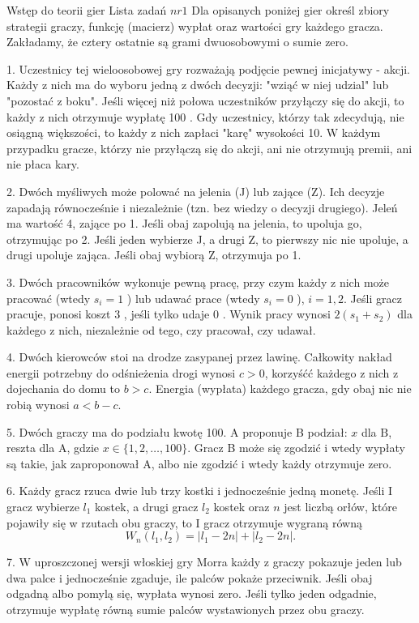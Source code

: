 \documentclass{article}
\begin{document}
Wstęp do teorii gier
Lista zadań $n r 1$
Dla opisanych poniżej gier określ zbiory strategii graczy, funkcję (macierz) wypłat oraz wartości gry każdego gracza. Zakładamy, że cztery ostatnie są grami dwuosobowymi o sumie zero.

1. Uczestnicy tej wieloosobowej gry rozważają podjęcie pewnej inicjatywy - akcji. Każdy z nich ma do wyboru jedną z dwóch decyzji: "wziąć w niej udzial" lub "pozostać z boku". Jeśli więcej niż połowa uczestników przyłączy się do akcji, to każdy z nich otrzymuje wypłatę 100 . Gdy uczestnicy, którzy tak zdecydują, nie osiągną większości, to każdy z nich zapłaci "karę" wysokości 10. W każdym przypadku gracze, którzy nie przyłączą się do akcji, ani nie otrzymują premii, ani nie płaca kary.

2. Dwóch myśliwych może polować na jelenia (J) lub zające (Z). Ich decyzje zapadają równocześnie i niezależnie (tzn. bez wiedzy o decyzji drugiego). Jeleń ma wartość 4, zające po 1. Jeśli obaj zapolują na jelenia, to upoluja go, otrzymując po 2. Jeśli jeden wybierze J, a drugi Z, to pierwszy nic nie upoluje, a drugi upoluje zająca. Jeśli obaj wybiorą Z, otrzymuja po 1.

3. Dwóch pracowników wykonuje pewną pracę, przy czym każdy z nich może pracować (wtedy $s_i=1$ ) lub udawać prace (wtedy $s_i=0$ ), $i=1,2$. Jeśli gracz pracuje, ponosi koszt 3 , jeśli tylko udaje 0 . Wynik pracy wynosi $2\left(s_1+s_2\right)$ dla każdego z nich, niezależnie od tego, czy pracował, czy udawał.

4. Dwóch kierowców stoi na drodze zasypanej przez lawinę. Całkowity nakład energii potrzebny do odśnieżenia drogi wynosi $c>0$, korzyśćć każdego z nich z dojechania do domu to $b>c$. Energia (wypłata) każdego gracza, gdy obaj nic nie robią wynosi $a<b-c$.

5. Dwóch graczy ma do podziału kwotę 100. A proponuje B podział: $x$ dla $\mathrm{B}$, reszta dla $\mathrm{A}$, gdzie $x \in\{1,2, \ldots, 100\}$. Gracz B może się zgodzić i wtedy wypłaty są takie, jak zaproponował A, albo nie zgodzić i wtedy każdy otrzymuje zero.

6. Każdy gracz rzuca dwie lub trzy kostki i jednocześnie jedną monetę. Jeśli I gracz wybierze $l_1$ kostek, a drugi gracz $l_2$ kostek oraz $n$ jest liczbą orłów, które pojawiły się w rzutach obu graczy, to I gracz otrzymuje wygraną równą
$$
W_n\left(l_1, l_2\right)=\left|l_1-2 n\right|+\left|l_2-2 n\right| .
$$

7. W uproszczonej wersji włoskiej gry Morra każdy z graczy pokazuje jeden lub dwa palce i jednocześnie zgaduje, ile palców pokaże przeciwnik. Jeśli obaj odgadną albo pomylą się, wypłata wynosi zero. Jeśli tylko jeden odgadnie, otrzymuje wypłatę równą sumie palców wystawionych przez obu graczy.
\end{document}
